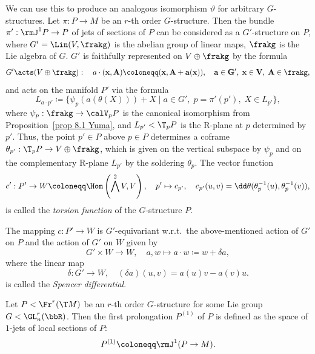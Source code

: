 We can use this to produce an analogous isomorphism $\vartheta$ for arbitrary $G$-structures. Let $\pi:P\to M$ be an $r$-th order $G$-structure. Then the bundle $\pi':\rmJ^1 P\to P$ of jets of sections of $P$ can be considered as a $G'$-structure on $P$, where $G'=\Lin(V,\frakg)$ is the abelian group of linear maps, $\frakg$ is the Lie algebra of $G$. $G'$ is faithfully represented on $V\oplus\frakg$ by the formula 
\[G'\acts (V\oplus\frakg):\quad a\cdot (\bf{x},A)\coloneqq (\bf{x},A+a(\bf{x})),\quad a\in G',\; \bf{x}\in V,\; A\in\frakg,\]
and acts on the manifold $P'$ via the formula
\[L_{a\cdot p'}\coloneqq \{\psi_p(a(\theta(X)))+X\mid a\in G',\; p=\pi'(p'),\; X\in L_{p'}\},\]
where $\psi_p:\frakg\to \calV_p P$ is the canonical isomorphism from Proposition~\ref{prop 8.1 Yuma}, and $L_{p'}<\T_p P$ is the R-plane at $p$ determined by $p'$. Thus, the point $p'\in P$ above $p\in P$ determines a coframe $\theta_{p'}:\T_p P\to V\oplus \frakg$, which is given on the vertical subspace by $\psi_p$ and on the complementary R-plane $L_{p'}$ by the soldering $\theta_p$. The vector function 
\[c':P'\to W\coloneqq \Hom\left(\bigwedge^2 V,V\right),\quad p'\mapsto c_{p'},\quad c_{p'}(u,v)=\dd \theta(\theta_p^{-1}(u),\theta_p^{-1}(v)),\]
is called the \emph{torsion function} of the $G$-structure $P$. 


The mapping $c:P'\to W$ is $G'$-equivariant w.r.t.\ the above-mentioned action of $G'$ on $P$ and the action of $G'$ on $W$ given by 
\[G'\times W\to W,\quad a,w\mapsto a\cdot w\coloneqq w+\delta a,\]
where the linear map 
\[\delta:G'\to W,\quad (\delta a)(u,v)=a(u)v-a(v)u.\]
is called the \emph{Spencer differential}. 

\begin{defn}
    Let $P<\Fr^r(\T M)$ be an $r$-th order $G$-structure for some Lie group $G<\GL_n^r(\bbR)$. Then the first prolongation $P^{(1)}$ of $P$ is defined as the space of $1$-jets of local sections of $P$:
    \[P^{(1)}\coloneqq \rmJ^1(P\to M).\]
\end{defn}


